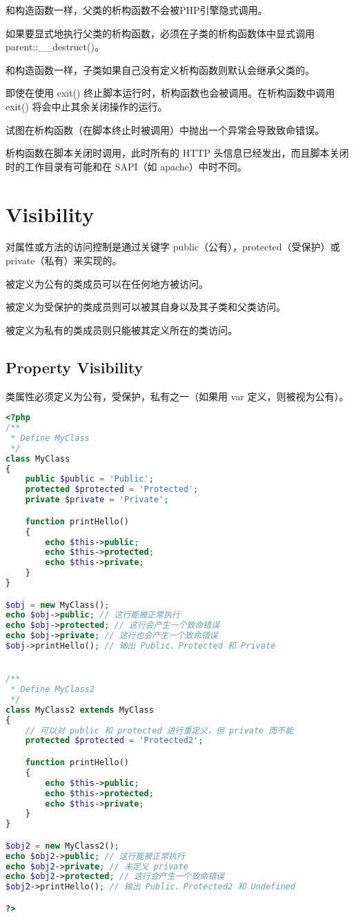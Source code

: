 和构造函数一样，父类的析构函数不会被PHP引擎隐式调用。

如果要显式地执行父类的析构函数，必须在子类的析构函数体中显式调用 parent::\_\_destruct()。

和构造函数一样，子类如果自己没有定义析构函数则默认会继承父类的。

即使在使用 exit() 终止脚本运行时，析构函数也会被调用。在析构函数中调用 exit() 将会中止其余关闭操作的运行。

试图在析构函数（在脚本终止时被调用）中抛出一个异常会导致致命错误。

析构函数在脚本关闭时调用，此时所有的 HTTP 头信息已经发出，而且脚本关闭时的工作目录有可能和在 SAPI（如 apache）中时不同。


\chapter{Visibility}

对属性或方法的访问控制是通过关键字 public（公有），protected（受保护）或 private（私有）来实现的。

\begin{compactitem}
\item 被定义为公有的类成员可以在任何地方被访问。
\item 被定义为受保护的类成员则可以被其自身以及其子类和父类访问。
\item 被定义为私有的类成员则只能被其定义所在的类访问。
\end{compactitem}


\section{Property Visibility}


类属性必须定义为公有，受保护，私有之一（如果用 var 定义，则被视为公有）。

\begin{lstlisting}[language=PHP]
<?php
/**
 * Define MyClass
 */
class MyClass
{
    public $public = 'Public';
    protected $protected = 'Protected';
    private $private = 'Private';

    function printHello()
    {
        echo $this->public;
        echo $this->protected;
        echo $this->private;
    }
}

$obj = new MyClass();
echo $obj->public; // 这行能被正常执行
echo $obj->protected; // 这行会产生一个致命错误
echo $obj->private; // 这行也会产生一个致命错误
$obj->printHello(); // 输出 Public、Protected 和 Private


/**
 * Define MyClass2
 */
class MyClass2 extends MyClass
{
    // 可以对 public 和 protected 进行重定义，但 private 而不能
    protected $protected = 'Protected2';

    function printHello()
    {
        echo $this->public;
        echo $this->protected;
        echo $this->private;
    }
}

$obj2 = new MyClass2();
echo $obj2->public; // 这行能被正常执行
echo $obj2->private; // 未定义 private
echo $obj2->protected; // 这行会产生一个致命错误
$obj2->printHello(); // 输出 Public、Protected2 和 Undefined

?>
\end{lstlisting}


